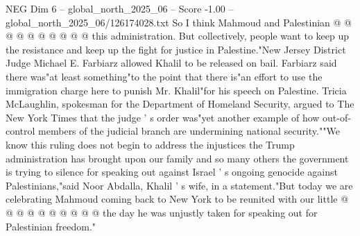 \begin{textsample}{NEG Dim 6 – global\_north\_2025\_06 – Score -1.00 – global\_north\_2025\_06/126174028.txt}
So I think Mahmoud and Palestinian @ @ @ @ @ @ @ @ @ @ this administration.
But collectively, people want to keep up the resistance and keep up the fight for justice in Palestine."New Jersey District Judge Michael E.
Farbiarz allowed Khalil to be released on bail.
Farbiarz said there was"at least something"to the point that there is"an effort to use the immigration charge here to punish Mr.
Khalil"for his speech on Palestine.
Tricia McLaughlin, spokesman for the Department of Homeland Security, argued to The New York Times that the judge ' s order was"yet another example of how out-of-control members of the judicial branch are undermining national security.""We know this ruling does not begin to address the injustices the Trump administration has brought upon our family and so many others the government is trying to silence for speaking out against Israel ' s ongoing genocide against Palestinians,"said Noor Abdalla, Khalil ' s wife, in a statement."But today we are celebrating Mahmoud coming back to New York to be reunited with our little @ @ @ @ @ @ @ @ @ @ the day he was unjustly taken for speaking out for Palestinian freedom."

\end{textsample}
